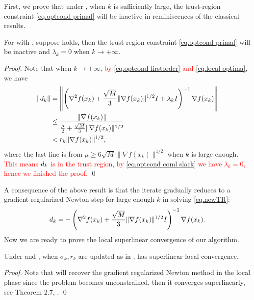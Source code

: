 First, we prove that under , when $k$ is sufficiently large, the trust-region constraint \eqref{eq.optcond primal} will be inactive in reminiscences of the classical results.
\begin{lemma}
    \label{lem.inactive tr simple}
    For  with , suppose  holds, then the trust-region constraint \eqref{eq.optcond primal} will be inactive and $\lambda_k = 0$ when $k\to +\infty$.
\end{lemma}
\begin{proof}
    Note that when $k\to +\infty$, \textcolor{red}{by \eqref{eq.optcond firstorder} and \eqref{eq.local optima}}, we have
    \begin{equation}
        \label{eq.local step norm simple}
        \begin{aligned}
        \|d_k\| &=\left\|\left(\nabla ^2 f(x_k)+\frac{\sqrt{M}}{3}\|\nabla f(x_k)\|^{1/2}I+\lambda_k I\right )^{-1}\nabla f(x_k)\right\|\\
        &\leq \frac{\|\nabla f(x_k)\|}{\frac{\mu}{2}+\frac{\sqrt{M}}{3}\|\nabla f(x_k)\|^{1/2}}\\
        &< r_k\|\nabla f(x_k)\|^{1/2},
        \end{aligned}
    \end{equation}
    where the last line is from $\mu \geq 6\sqrt{M}\|\nabla f(x_k)\|^{1/2}$ when $k$ is large enough. \textcolor{red}{This means $d_k$ is in the trust region, by \eqref{eq.optcond coml slack} we have $\lambda_k = 0$, hence we finished the proof.}
\smartqed \qed \end{proof}
A consequence of the above result is that the iterate gradually reduces to a gradient regularized Newton step for large enough $k$ in solving \eqref{eq.newTR}:
\begin{equation}
    \label{eq.GR Newton}
    d_k = -\left(\nabla ^2 f(x_k)+\frac{\sqrt{M}}{3}\|\nabla f(x_k)\|^{1/2}I\right)^{-1}\nabla f(x_k).
\end{equation}
Now we are ready to prove the local superlinear convergence of our algorithm.
\begin{theorem}
    \label{thm.local simple}
    Under  and , when $\sigma_k,r_k$ are updated as in ,  has superlinear local convergence.
\end{theorem}
\begin{proof}
    Note that  will recover the gradient regularized Newton method in the local phase since the problem becomes unconstrained, then it converges superlinearly, see Theorem 2.7, \cite{mishchenko_regularized_2023}.
\smartqed \qed \end{proof}

